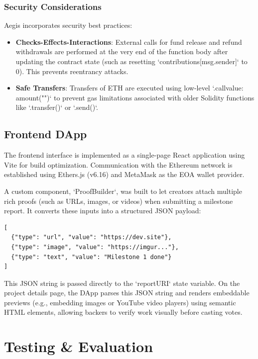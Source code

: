 \documentclass[conference]{IEEEtran}
\begin{document}
\subsubsection{Security Considerations}
Aegis incorporates security best practices:
\begin{itemize}
	\item \textbf{Checks-Effects-Interactions}: External calls for fund release and refund withdrawals are performed at the very end of the function body after updating the contract state (such as resetting `contributions[msg.sender]` to 0). This prevents reentrancy attacks.
	\item \textbf{Safe Transfers}: Transfers of ETH are executed using low-level `.call{value: amount}("")` to prevent gas limitations associated with older Solidity functions like `.transfer()` or `.send()`.
\end{itemize}

\subsection{Frontend DApp}
The frontend interface is implemented as a single-page React application using Vite for build optimization. Communication with the Ethereum network is established using Ethers.js (v6.16) and MetaMask as the EOA wallet provider. 

A custom component, `ProofBuilder`, was built to let creators attach multiple rich proofs (such as URLs, images, or videos) when submitting a milestone report. It converts these inputs into a structured JSON payload:
\begin{verbatim}
[
  {"type": "url", "value": "https://dev.site"},
  {"type": "image", "value": "https://imgur..."},
  {"type": "text", "value": "Milestone 1 done"}
]
\end{verbatim}
This JSON string is passed directly to the `reportURI` state variable. On the project details page, the DApp parses this JSON string and renders embeddable previews (e.g., embedding images or YouTube video players) using semantic HTML elements, allowing backers to verify work visually before casting votes.

\section{Testing \& Evaluation}
\end{document}
